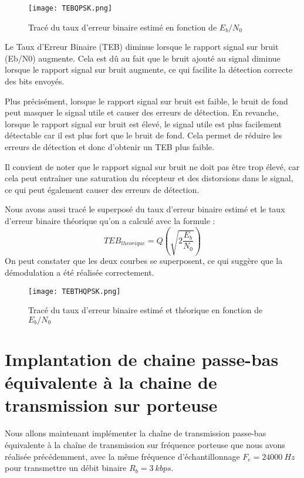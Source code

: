 \documentclass[11pt]{article}
\begin{document}
\begin{figure}[ht!]
    \centering
    \texttt{[image: TEBQPSK.png]}
    \caption{Tracé du taux d'erreur binaire estimé en fonction de $E_b/N_0$  \label{fig : TEBQPSK}}
\end{figure}


Le Taux d'Erreur Binaire (TEB) diminue lorsque le rapport signal sur bruit (Eb/N0) augmente. Cela est dû au fait que le bruit ajouté au signal diminue lorsque le rapport signal sur bruit augmente, ce qui facilite la détection correcte des bits envoyés.

Plus précisément, lorsque le rapport signal sur bruit est faible, le bruit de fond peut masquer le signal utile et causer des erreurs de détection. En revanche, lorsque le rapport signal sur bruit est élevé, le signal utile est plus facilement détectable car il est plus fort que le bruit de fond. Cela permet de réduire les erreurs de détection et donc d'obtenir un TEB plus faible.

Il convient de noter que le rapport signal sur bruit ne doit pas être trop élevé, car cela peut entraîner une saturation du récepteur et des distorsions dans le signal, ce qui peut également causer des erreurs de détection.

Nous avons aussi tracé le superposé du taux d'erreur binaire estimé et le taux d'erreur binaire théorique qu'on a calculé avec la formule :
$$TEB_{theorique} = Q(\sqrt{2\frac{E_b}{N_0}})$$
On peut constater que les deux courbes se superposent, ce qui suggère que la démodulation a été réalisée correctement.\\
\begin{figure}[ht!]
    \centering
    \texttt{[image: TEBTHQPSK.png]}
    \caption{Tracé du taux d'erreur binaire estimé et théorique en fonction de $E_b/N_0$  \label{fig : TEBQPSK}}
\end{figure}

\section{Implantation de chaine passe-bas équivalente à la chaine de transmission sur porteuse}

Nous allons maintenant implémenter la chaîne de transmission passe-bas équivalente à la chaîne de transmission sur fréquence porteuse que nous avons réalisée précédemment, avec la même fréquence d'échantillonnage $F_e = 24000 \ Hz$ pour transmettre un débit binaire $R_b = 3 \ kbps$.
\end{document}
